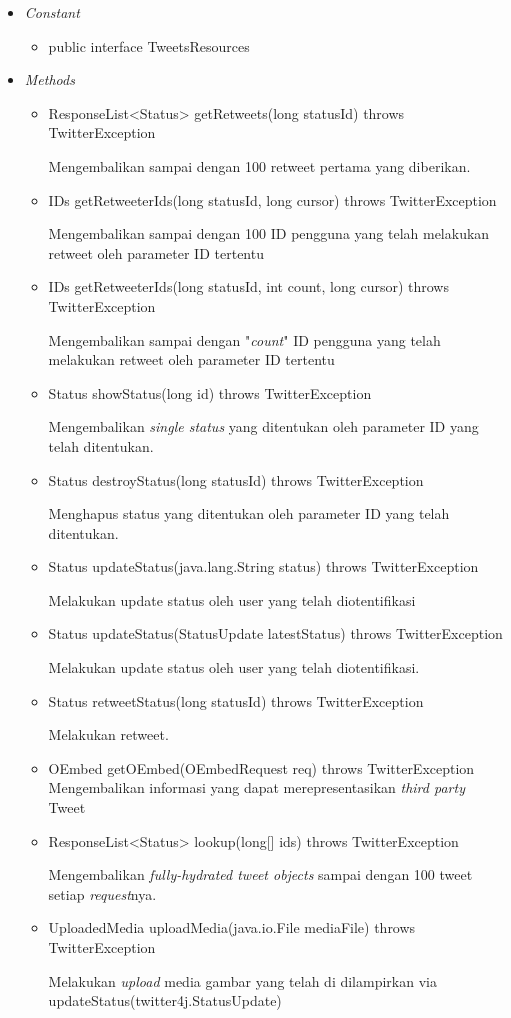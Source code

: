 	\begin{itemize}
		\item \textit{Constant}
		
			\begin{itemize}
				\item public interface TweetsResources
			\end{itemize}
		\item \textit{Methods}
		
		\begin{itemize}
			\item ResponseList<Status> getRetweets(long statusId) throws TwitterException
			
			Mengembalikan sampai dengan 100 retweet pertama yang diberikan.
			\item IDs getRetweeterIds(long statusId, long cursor) throws TwitterException
			
			Mengembalikan sampai dengan 100 ID pengguna yang telah melakukan retweet oleh parameter ID tertentu
			\item IDs getRetweeterIds(long statusId, int count, long cursor) throws TwitterException
			
			Mengembalikan sampai dengan "\textit{count}" ID pengguna yang telah melakukan retweet oleh parameter ID tertentu
			\item Status showStatus(long id) throws TwitterException
			
			Mengembalikan \textit{single status} yang ditentukan oleh parameter ID yang telah ditentukan.
			\item Status destroyStatus(long statusId) throws TwitterException
			
			Menghapus status yang ditentukan oleh parameter ID yang telah ditentukan.
			\item Status updateStatus(java.lang.String status) throws TwitterException
			
			Melakukan update status oleh user yang telah diotentifikasi
			\item Status updateStatus(StatusUpdate latestStatus) throws TwitterException
			
			Melakukan update status oleh user yang telah diotentifikasi.
			\item Status retweetStatus(long statusId) throws TwitterException
			
			Melakukan retweet.
			\item OEmbed getOEmbed(OEmbedRequest req) throws TwitterException
			Mengembalikan informasi yang dapat merepresentasikan \textit{third party} Tweet
			
			\item ResponseList<Status> lookup(long[] ids) throws TwitterException
			
			Mengembalikan \textit{fully-hydrated tweet objects} sampai dengan 100 tweet setiap \textit{request}nya.
			\item UploadedMedia uploadMedia(java.io.File mediaFile) throws TwitterException
			
			Melakukan \textit{upload} media gambar yang telah di dilampirkan via updateStatus(twitter4j.StatusUpdate)
		\end{itemize}
	\end{itemize}


